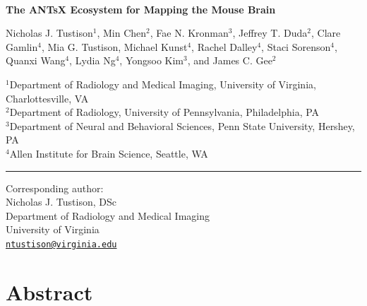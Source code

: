 \documentclass[
  12pt,
]{article}
\author{}
\date{\vspace{-2.5em}}
\begin{document}
\linenumbers
{}


\begin{centering}

$ $

\vspace{6cm}

\LARGE

{\bf The ANTsX Ecosystem for Mapping the Mouse Brain}

\vspace{1.0 cm}

\normalsize

Nicholas J. Tustison$^{1}$,
Min Chen$^{2}$,
Fae N. Kronman$^{3}$,
Jeffrey T. Duda$^{2}$,
Clare Gamlin$^{4}$,
Mia G. Tustison,
Michael Kunst$^{4}$,
Rachel Dalley$^{4}$,
Staci Sorenson$^{4}$,
Quanxi Wang$^{4}$,
Lydia Ng$^{4}$,
Yongsoo Kim$^{3}$, and
James C. Gee$^{2}$

\small

$^{1}$Department of Radiology and Medical Imaging, University of Virginia, Charlottesville, VA \\
$^{2}$Department of Radiology, University of Pennsylvania, Philadelphia, PA \\
$^{3}$Department of Neural and Behavioral Sciences, Penn State University, Hershey, PA \\
$^{4}$Allen Institute for Brain Science, Seattle, WA \\

\vspace{1.2 cm}

\end{centering}

\vspace{5.5 cm}

\noindent

\rule{4cm}{0.4pt}

\scriptsize

Corresponding author:\\
Nicholas J. Tustison, DSc\\
Department of Radiology and Medical Imaging\\
University of Virginia\\
\href{mailto:ntustison@virginia.edu}{\nolinkurl{ntustison@virginia.edu}}

\normalsize

\newpage


\hypertarget{abstract}{%
\section*{Abstract}\label{abstract}}
\end{document}
